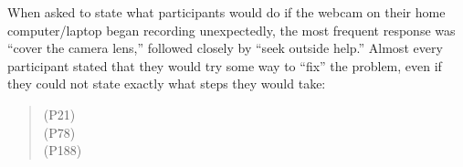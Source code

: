 \documentclass{sigchi}
\newenvironment{packed_item}{
\begin{itemize}
  \setlength{\itemsep}{1pt}
  \setlength{\parskip}{0pt}
  \setlength{\parsep}{0pt}
}{\end{itemize}}
\begin{document}


%
%
%
%
%

When asked to state what participants would do if the webcam on their home computer/laptop began recording unexpectedly, the most frequent response was ``cover the camera lens,'' followed closely by ``seek outside help.'' Almost every participant stated that they would try some way to ``fix'' the problem, even if they could not state exactly what steps they would take:

\begin{quotation}
 (P21)\\

 (P78)\\

 (P188)

\end{quotation}
\end{document}
